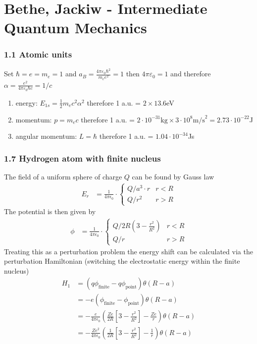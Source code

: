 \documentclass[10pt,a4paper]{book}
\theoremstyle{definition}
\begin{document}
\section{{\sc Bethe, Jackiw} - Intermediate Quantum Mechanics}
\subsubsection{1.1 Atomic units}
Set $\hbar=e=m_e=1$ and $a_B=\frac{4\pi\varepsilon_0\hbar^2}{m_ee^2}=1$ then $4\pi\varepsilon_0=1$ and therefore $\alpha=\frac{e^2}{4\pi\varepsilon_0\hbar c}=1/c$
\begin{enumerate}
\item energy: $E_{1s}=\frac{1}{2}m_ec^2\alpha^2$ therefore 1 a.u. = $2\times13.6$eV
\item momentum: $p=m_e c$ therefore 1 a.u. = $2\cdot 10^{-31}\text{kg}\times 3\cdot 10^8\text{m/s}^2=2.73\cdot10^{-22}$J
\item angular momentum: $L=\hbar$ therefore 1 a.u. = $1.04\cdot10^{-34}$Js 
\end{enumerate}

\subsubsection{1.7 Hydrogen atom with finite nucleus}
The field of a uniform sphere of charge $Q$ can be found by Gauss law
\begin{align}
E_r&=\frac{1}{4\pi\epsilon_0}\cdot\left\{
\begin{array}{ll}
Q/a^3\cdot r & r<R\\
Q/r^2 & r>R
\end{array}
\right.
\end{align}
The potential is then given by
\begin{align}
\phi&=\frac{1}{4\pi\epsilon_0}\cdot\left\{
\begin{array}{ll}
Q/2R\left(3-\frac{r^2}{R^2}\right) & r<R\\
Q/r & r>R
\end{array}
\right.
\end{align}
Treating this as a perturbation problem the energy shift can be calculated via the perturbation Hamiltonian (switching the electrostatic energy within the finite nucleus)
\begin{align}
H_1
&=(q\phi_\text{finite}-q\phi_\text{point})\theta(R-a)\\
&=-e\left(\phi_\text{finite}-\phi_\text{point}\right)\theta(R-a)\\
&=-\frac{e}{4\pi\epsilon_0}\left(\frac{Ze}{2R}
\left[3-\frac{r^2}{R^2}\right]-\frac{Ze}{r}\right)\theta(R-a)\\
&=-\frac{Ze^2}{4\pi\epsilon_0}\left(\frac{1}{2R}
\left[3-\frac{r^2}{R^2}\right]-\frac{1}{r}\right)\theta(R-a)\\
\end{align}
\end{document}
